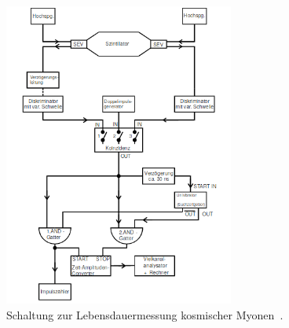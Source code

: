     \begin{figure}[H]
      \centering
      \includegraphics[height=10cm]{myonaufbau.png}
      \caption{Schaltung zur Lebensdauermessung kosmischer Myonen~\cite{anleitung}.}
      \label{fig:schaltung}
    \end{figure}


